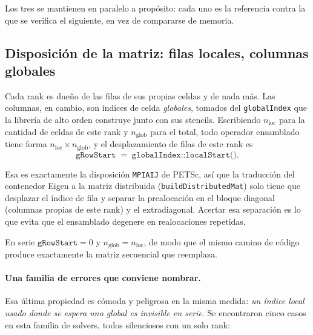 \documentclass[11pt,a4paper]{article}
\newcommand{\code}[1]{\texttt{\small #1}}
\begin{document}
Los tres se mantienen en paralelo a propósito: cada uno es la referencia contra
la que se verifica el siguiente, en vez de compararse de memoria.

\subsection{Disposición de la matriz: filas locales, columnas globales}
\label{sec:dist-layout}

Cada rank es dueño de las filas de sus propias celdas y de nada más. Las
columnas, en cambio, son índices de celda \emph{globales}, tomados del
\code{globalIndex} que la librería de alto orden construye junto con sus
stencils. Escribiendo $n_{\text{loc}}$ para la cantidad de celdas de este rank y
$n_{\text{glob}}$ para el total, todo operador ensamblado tiene forma
$n_{\text{loc}}\times n_{\text{glob}}$, y el desplazamiento de filas de este
rank es
\[
   \texttt{gRowStart} \;=\; \texttt{globalIndex::localStart()} .
\]

Esa es exactamente la disposición \code{MPIAIJ} de PETSc, así que la traducción
del contenedor Eigen a la matriz distribuida (\code{buildDistributedMat}) solo
tiene que desplazar el índice de fila y separar la prealocación en el bloque
diagonal (columnas propias de este rank) y el extradiagonal. Acertar esa
separación es lo que evita que el ensamblado degenere en realocaciones
repetidas.

En serie $\texttt{gRowStart}=0$ y $n_{\text{glob}}=n_{\text{loc}}$, de modo que
el mismo camino de código produce exactamente la matriz secuencial que
reemplaza.

\paragraph{Una familia de errores que conviene nombrar.} Esa última propiedad es
cómoda y peligrosa en la misma medida: \emph{un índice local usado donde se
espera uno global es invisible en serie}. Se encontraron cinco casos en esta
familia de solvers, todos silenciosos con un solo rank:
\end{document}

